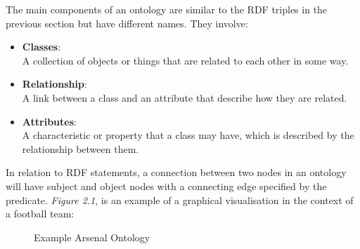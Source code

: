The main components of an ontology are similar to the RDF triples in the previous section but have different names. They involve:

\vspace{-0.15cm}
\begin{itemize}
    \itemsep0em 
\item \textbf{Classes}: \\
A collection of objects or things that are related to each other in some way.

\item \textbf{Relationship}: \\
A link between a class and an attribute that describe how they are related. 

\item \textbf{Attributes}:\\ 
A characteristic or property that a class may have, which is described by the relationship between them.

\end{itemize}
\vspace{-0.15cm}

In relation to RDF statements, a connection between two nodes in an ontology will have subject and object nodes with a connecting edge specified by the predicate. \textit{Figure 2.1}, is an example of a graphical visualisation in the context of a football team:

\begin{figure}[H]
\begin{center}
\end{center}
\vspace{-0.2cm}
\caption{Example Arsenal Ontology}
\end{figure}
\vspace{-0.15cm}

